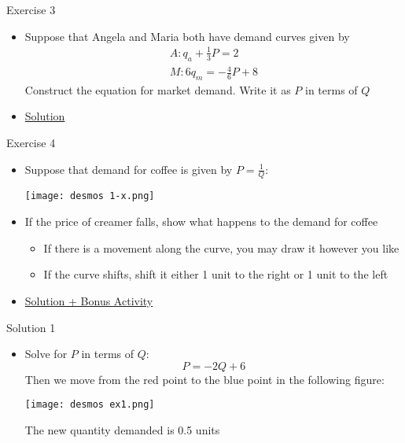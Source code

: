 \documentclass[10pt,xcolor={svgnames}]{beamer}
\begin{document}
\begin{frame}{Exercise 3}
    \begin{itemize}[<+->]
        \item Suppose that Angela and Maria both have demand curves given by 
        \begin{align*}
            A: q_{a}+\frac{1}{3}P=2\\
            M: 6q_{m}=-\frac{4}{6}P+8
        \end{align*}
        Construct the equation for market demand. Write it as $P$ in terms of $Q$
        \item \hyperlink{Sol3}{\alert{Solution}}
    \end{itemize}
\end{frame}


\begin{frame}{Exercise 4}
    \begin{itemize}[<+->]
        \item Suppose that demand for coffee is given by $P=\frac{1}{Q}$:
        \begin{center}
            \texttt{[image: desmos 1-x.png]}
        \end{center}
        \item If the price of creamer falls, show what happens to the demand for coffee
        \begin{itemize}
            \item<2-> If there is a movement along the curve, you may draw it however you like
            \item<2-> If the curve shifts, shift it either 1 unit to the right or 1 unit to the left
        \end{itemize}
        \item \hyperlink{Sol4}{\alert{Solution + Bonus Activity}}
    \end{itemize}
\end{frame}


\begin{frame}{Solution 1}
    \begin{itemize}
        \item Solve for $P$ in terms of $Q$: 
        $$P=-2Q+6$$
        Then we move from the red point to the blue point in the following figure:
        \begin{center}
            \texttt{[image: desmos ex1.png]}
        \end{center}
        The new quantity demanded is 0.5 units
    \end{itemize}
    \label{Sol1}
\end{frame}
\end{document}
